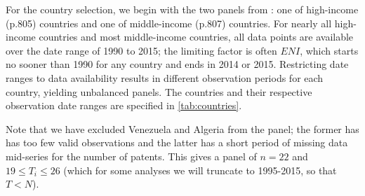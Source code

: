 \documentclass[12pt,a4paper]{article}
\begin{document}
For the country selection, we begin with the two panels from \cite{tibaIncomeTradeOpenness2018}: one of high-income (p.805) countries and one of middle-income (p.807) countries.
For nearly all high-income countries and most middle-income countries, all data points are available over the date range of 1990 to 2015; the limiting factor is often $ENI$, which starts no sooner than 1990 for any country and ends in 2014 or 2015.
Restricting date ranges to data availability results in different observation periods for each country, yielding unbalanced panels.
The countries and their respective observation date ranges are specified in \cref{tab:countries}.

Note that we have excluded Venezuela and Algeria from the panel; the former has has too few valid observations and the latter has a short period of missing data mid-series for the number of patents.
This gives a panel of $n=22$ and $19 \leq T_i \leq 26$ (which for some analyses we will truncate to 1995-2015, so that $T < N$).
\end{document}
